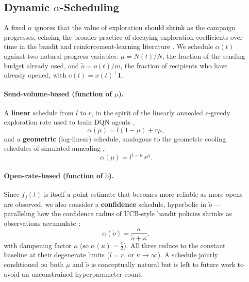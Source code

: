 \subsection{Dynamic $\alpha$-Scheduling}
\label{sec:alpha-scheduling}

A fixed $\alpha$ ignores that the value of exploration should shrink as the
campaign progresses, echoing the broader practice of decaying exploration
coefficients over time in the bandit and reinforcement-learning literature
\citep{auer2002finite}. We schedule $\alpha(t)$ against two natural progress
variables: $\mu = N(t)/N$, the fraction of the sending budget already used,
and $\tilde o = o(t)/m$, the fraction of recipients who have already
opened, with $o(t) = x(t)^\top\mathbf{1}$.

\paragraph{Send-volume-based (function of $\mu$).}
A \textbf{linear} schedule from $l$ to $r$, in the spirit of the linearly
annealed $\varepsilon$-greedy exploration rate used to train DQN agents
\citep{mnih2015human},
\begin{equation}
\label{eq:alpha-linear}
\alpha(\mu) = l(1-\mu) + r\mu,
\end{equation}
and a \textbf{geometric} (log-linear) schedule, analogous to the geometric
cooling schedules of simulated annealing \citep{mahdi2017performance},
\begin{equation}
\label{eq:alpha-geometric}
\alpha(\mu) = l^{1-\mu}\, r^{\mu}.
\end{equation}

\paragraph{Open-rate-based (function of $\tilde o$).}
Since $f_j(t)$ is itself a point estimate that becomes more reliable as
more opens are observed, we also consider a \textbf{confidence} schedule,
hyperbolic in $\tilde o$ --- paralleling how the confidence radius of
UCB-style bandit policies shrinks as observations accumulate
\citep{auer2002finite}:
\begin{equation}
\label{eq:alpha-confidence}
\alpha(\tilde o) = \frac{\kappa}{\tilde o + \kappa},
\end{equation}
with dampening factor $\kappa$ (so $\alpha(\kappa)=\tfrac12$). All three
reduce to the constant baseline at their degenerate limits ($l=r$, or
$\kappa\to\infty$). A schedule jointly conditioned on both $\mu$ and
$\tilde o$ is conceptually natural but is left to future work
to avoid an unconstrained hyperparameter count.
